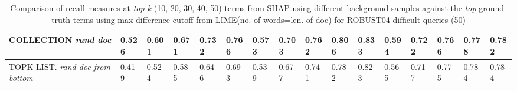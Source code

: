 \begin{table}
{\begin{tabular}{ |m{6em}|m{2.8em}|m{2.8em}|m{2.8em}|m{2.8em}|m{2.8em}||m{2.8em}|m{2.8em}|m{2.8em}|m{2.8em}|m{2.8em}||m{2.8em}|m{2.8em}|m{2.8em}|m{2.8em}|m{2.8em}|| }



COLLECTION \newline \textit{rand doc} & 0.526 & 0.601 & 0.671 & 0.732 & 0.766 & 0.573 & 0.703 & 0.762 & 0.806 & 0.833 & 0.594 & 0.722 & 0.766 & 0.778 & 0.782\\
\hline

TOPK LIST. \newline \textit{rand doc from bottom} & 0.419 & 0.524 & 0.585 & 0.646 & 0.693 & 0.539 & 0.677 & 0.741 & 0.782 & 0.823 & 0.565 & 0.717 & 0.775 & 0.784 & 0.784\\
\hline

 \end{tabular}}
\caption{Comparison of recall measures at \textit{top-k} (10, 20, 30, 40, 50) terms from SHAP using different background samples against the \textit{top} ground-truth terms using max-difference cutoff from LIME(no. of words=len. of doc) for ROBUST04 difficult queries (50)}
\label{table_diff_max_terms_recall_different}
\end{table}

